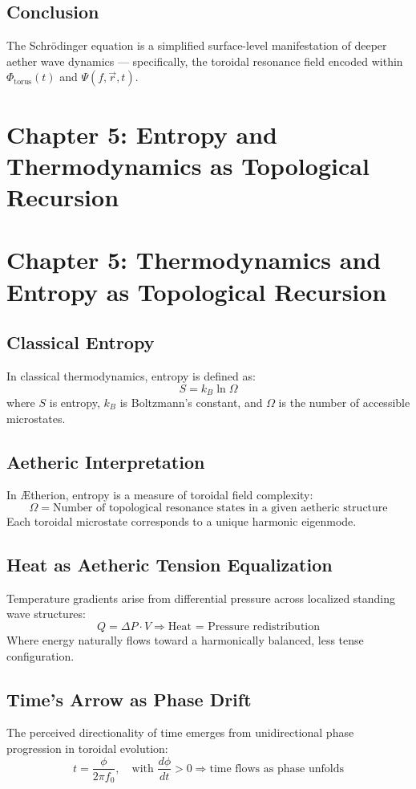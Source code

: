 \documentclass[12pt]{book}
\begin{document}
\subsection*{Conclusion}
The Schrödinger equation is a simplified surface-level manifestation of deeper aether wave dynamics — specifically, the toroidal resonance field encoded within $\Phi_{\text{torus}}(t)$ and $\Psi(f, \vec{r}, t)$.



\section*{Chapter 5: Entropy and Thermodynamics as Topological Recursion}


\section*{Chapter 5: Thermodynamics and Entropy as Topological Recursion}

\subsection*{Classical Entropy}
In classical thermodynamics, entropy is defined as:
\[
S = k_B \ln \Omega
\]
where $S$ is entropy, $k_B$ is Boltzmann’s constant, and $\Omega$ is the number of accessible microstates.

\subsection*{Aetheric Interpretation}
In Ætherion, entropy is a measure of toroidal field complexity:
\[
\Omega = \text{Number of topological resonance states in a given aetheric structure}
\]
Each toroidal microstate corresponds to a unique harmonic eigenmode.

\subsection*{Heat as Aetheric Tension Equalization}
Temperature gradients arise from differential pressure across localized standing wave structures:
\[
Q = \Delta P \cdot V \Rightarrow \text{Heat = Pressure redistribution}
\]
Where energy naturally flows toward a harmonically balanced, less tense configuration.

\subsection*{Time’s Arrow as Phase Drift}
The perceived directionality of time emerges from unidirectional phase progression in toroidal evolution:
\[
t = \frac{\phi}{2\pi f_0}, \quad \text{with } \frac{d\phi}{dt} > 0 \Rightarrow \text{time flows as phase unfolds}
\]
\end{document}
